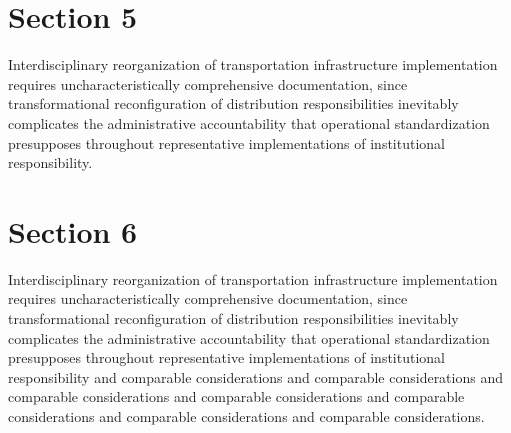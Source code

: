 \documentclass[11pt]{article}
\begin{document}
\section{Section 5}
Interdisciplinary reorganization of transportation infrastructure
implementation requires uncharacteristically comprehensive documentation,
since transformational reconfiguration of distribution responsibilities
inevitably complicates the administrative accountability that operational
standardization presupposes throughout representative implementations of
institutional responsibility.

\section{Section 6}
Interdisciplinary reorganization of transportation infrastructure
implementation requires uncharacteristically comprehensive documentation,
since transformational reconfiguration of distribution responsibilities
inevitably complicates the administrative accountability that operational
standardization presupposes throughout representative implementations of
institutional responsibility and comparable considerations and comparable
considerations and comparable considerations and comparable considerations
and comparable considerations and comparable considerations and comparable
considerations.
\end{document}
